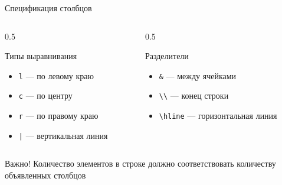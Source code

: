 \documentclass[aspectratio=169]{beamer}
\begin{document}
\begin{frame}{Спецификация столбцов}
    \begin{columns}[T]
        \begin{column}{0.5\textwidth}
            \begin{block}{Типы выравнивания}
                \begin{itemize}
                    \item \texttt{l} — по левому краю
                    \item \texttt{c} — по центру
                    \item \texttt{r} — по правому краю
                    \item \texttt{|} — вертикальная линия
                \end{itemize}
            \end{block}
        \end{column}
        
        \begin{column}{0.5\textwidth}
            \begin{block}{Разделители}
                \begin{itemize}
                    \item \texttt{\&} — между ячейками
                    \item \texttt{\textbackslash\textbackslash} — конец строки
                    \item \texttt{\textbackslash hline} — горизонтальная линия
                \end{itemize}
            \end{block}
        \end{column}
    \end{columns}
    
    \vspace{0.5cm}
    
    \begin{alertblock}{Важно!}
        Количество элементов в строке должно соответствовать количеству объявленных столбцов
    \end{alertblock}
\end{frame}
\end{document}
